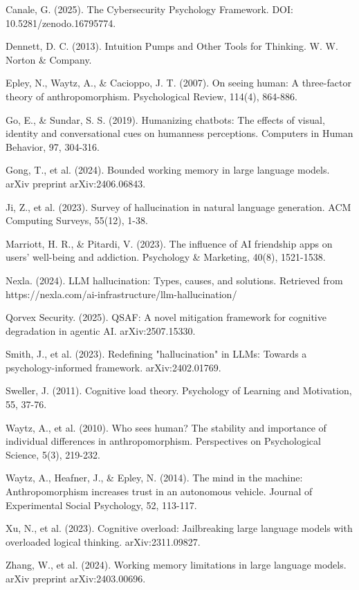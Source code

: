 \documentclass[11pt,a4paper]{article}
\begin{document}
\begin{thebibliography}{99}

Canale, G. (2025). The Cybersecurity Psychology Framework. DOI: 10.5281/zenodo.16795774.

Dennett, D. C. (2013). Intuition Pumps and Other Tools for Thinking. W. W. Norton \& Company.

Epley, N., Waytz, A., \& Cacioppo, J. T. (2007). On seeing human: A three-factor theory of anthropomorphism. Psychological Review, 114(4), 864-886.

Go, E., \& Sundar, S. S. (2019). Humanizing chatbots: The effects of visual, identity and conversational cues on humanness perceptions. Computers in Human Behavior, 97, 304-316.

Gong, T., et al. (2024). Bounded working memory in large language models. arXiv preprint arXiv:2406.06843.

Ji, Z., et al. (2023). Survey of hallucination in natural language generation. ACM Computing Surveys, 55(12), 1-38.

Marriott, H. R., \& Pitardi, V. (2023). The influence of AI friendship apps on users' well-being and addiction. Psychology \& Marketing, 40(8), 1521-1538.

Nexla. (2024). LLM hallucination: Types, causes, and solutions. Retrieved from https://nexla.com/ai-infrastructure/llm-hallucination/

Qorvex Security. (2025). QSAF: A novel mitigation framework for cognitive degradation in agentic AI. arXiv:2507.15330.

Smith, J., et al. (2023). Redefining "hallucination" in LLMs: Towards a psychology-informed framework. arXiv:2402.01769.

Sweller, J. (2011). Cognitive load theory. Psychology of Learning and Motivation, 55, 37-76.

Waytz, A., et al. (2010). Who sees human? The stability and importance of individual differences in anthropomorphism. Perspectives on Psychological Science, 5(3), 219-232.

Waytz, A., Heafner, J., \& Epley, N. (2014). The mind in the machine: Anthropomorphism increases trust in an autonomous vehicle. Journal of Experimental Social Psychology, 52, 113-117.

Xu, N., et al. (2023). Cognitive overload: Jailbreaking large language models with overloaded logical thinking. arXiv:2311.09827.

Zhang, W., et al. (2024). Working memory limitations in large language models. arXiv preprint arXiv:2403.00696.

\end{thebibliography}
\end{document}

